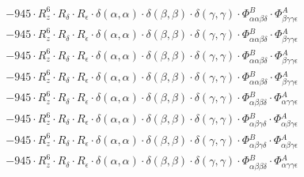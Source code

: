 \documentclass{article}
\begin{document}
\begin{subequations}
\begin{gather}
\begin{array}{c}
 \\[0.2em] 		 - 945 \cdot R_{z}^{6} \cdot R_{\delta{}} \cdot R_{\epsilon{}} \cdot \delta{}\left(\alpha{}, \alpha{}\right) \cdot \delta{}\left(\beta{}, \beta{}\right) \cdot \delta{}\left(\gamma{}, \gamma{}\right) \cdot \Phi{}^{B}_{\alpha{}\alpha{}\beta{}\delta{}} \cdot \Phi{}^{A}_{\beta{}\gamma{}\gamma{}\epsilon{}} 
 \\[0.2em] 		 - 945 \cdot R_{z}^{6} \cdot R_{\delta{}} \cdot R_{\epsilon{}} \cdot \delta{}\left(\alpha{}, \alpha{}\right) \cdot \delta{}\left(\beta{}, \beta{}\right) \cdot \delta{}\left(\gamma{}, \gamma{}\right) \cdot \Phi{}^{B}_{\alpha{}\alpha{}\beta{}\delta{}} \cdot \Phi{}^{A}_{\beta{}\gamma{}\gamma{}\epsilon{}} 
 \\[0.2em] 		 - 945 \cdot R_{z}^{6} \cdot R_{\delta{}} \cdot R_{\epsilon{}} \cdot \delta{}\left(\alpha{}, \alpha{}\right) \cdot \delta{}\left(\beta{}, \beta{}\right) \cdot \delta{}\left(\gamma{}, \gamma{}\right) \cdot \Phi{}^{B}_{\alpha{}\alpha{}\beta{}\delta{}} \cdot \Phi{}^{A}_{\beta{}\gamma{}\gamma{}\epsilon{}} 
 \\[0.2em] 		 - 945 \cdot R_{z}^{6} \cdot R_{\delta{}} \cdot R_{\epsilon{}} \cdot \delta{}\left(\alpha{}, \alpha{}\right) \cdot \delta{}\left(\beta{}, \beta{}\right) \cdot \delta{}\left(\gamma{}, \gamma{}\right) \cdot \Phi{}^{B}_{\alpha{}\alpha{}\beta{}\delta{}} \cdot \Phi{}^{A}_{\beta{}\gamma{}\gamma{}\epsilon{}} 
 \\[0.2em] 		 - 945 \cdot R_{z}^{6} \cdot R_{\delta{}} \cdot R_{\epsilon{}} \cdot \delta{}\left(\alpha{}, \alpha{}\right) \cdot \delta{}\left(\beta{}, \beta{}\right) \cdot \delta{}\left(\gamma{}, \gamma{}\right) \cdot \Phi{}^{B}_{\alpha{}\beta{}\beta{}\delta{}} \cdot \Phi{}^{A}_{\alpha{}\gamma{}\gamma{}\epsilon{}} 
 \\[0.2em] 		 - 945 \cdot R_{z}^{6} \cdot R_{\delta{}} \cdot R_{\epsilon{}} \cdot \delta{}\left(\alpha{}, \alpha{}\right) \cdot \delta{}\left(\beta{}, \beta{}\right) \cdot \delta{}\left(\gamma{}, \gamma{}\right) \cdot \Phi{}^{B}_{\alpha{}\beta{}\gamma{}\delta{}} \cdot \Phi{}^{A}_{\alpha{}\beta{}\gamma{}\epsilon{}} 
 \\[0.2em] 		 - 945 \cdot R_{z}^{6} \cdot R_{\delta{}} \cdot R_{\epsilon{}} \cdot \delta{}\left(\alpha{}, \alpha{}\right) \cdot \delta{}\left(\beta{}, \beta{}\right) \cdot \delta{}\left(\gamma{}, \gamma{}\right) \cdot \Phi{}^{B}_{\alpha{}\beta{}\gamma{}\delta{}} \cdot \Phi{}^{A}_{\alpha{}\beta{}\gamma{}\epsilon{}} 
 \\[0.2em] 		 - 945 \cdot R_{z}^{6} \cdot R_{\delta{}} \cdot R_{\epsilon{}} \cdot \delta{}\left(\alpha{}, \alpha{}\right) \cdot \delta{}\left(\beta{}, \beta{}\right) \cdot \delta{}\left(\gamma{}, \gamma{}\right) \cdot \Phi{}^{B}_{\alpha{}\beta{}\beta{}\delta{}} \cdot \Phi{}^{A}_{\alpha{}\gamma{}\gamma{}\epsilon{}} 

\end{array}
\end{gather}
\end{subequations}
\end{document}
